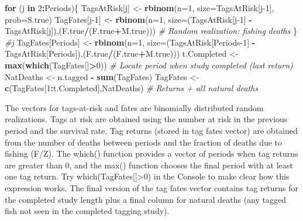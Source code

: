 \documentclass[
]{krantz}
\makeatletter
\newenvironment{Shaded}{\begin{snugshade}}{\end{snugshade}}
\newcommand{\AttributeTok}[1]{\textcolor[rgb]{0.27,0.27,0.27}{#1}}
\newcommand{\CommentTok}[1]{\textcolor[rgb]{0.37,0.37,0.37}{\textit{#1}}}
\newcommand{\ControlFlowTok}[1]{\textcolor[rgb]{0.27,0.27,0.27}{\textbf{#1}}}
\newcommand{\DecValTok}[1]{\textcolor[rgb]{0.06,0.06,0.06}{#1}}
\newcommand{\FunctionTok}[1]{\textcolor[rgb]{0.27,0.27,0.27}{\textbf{#1}}}
\newcommand{\NormalTok}[1]{#1}
\newcommand{\OtherTok}[1]{\textcolor[rgb]{0.37,0.37,0.37}{#1}}
\newcommand{\SpecialCharTok}[1]{\textcolor[rgb]{0.43,0.43,0.43}{\textbf{#1}}}
\newenvironment{kframe}{%
\medskip{}
\setlength{\fboxsep}{.8em}
 \def\at@end@of@kframe{}%
 \ifinner\ifhmode%
  \def\at@end@of@kframe{\end{minipage}}%
  \begin{minipage}{\columnwidth}%
 \fi\fi%
 \def\FrameCommand##1{\hskip\@totalleftmargin \hskip-\fboxsep
 \colorbox{shadecolor}{##1}\hskip-\fboxsep
     \hskip-\linewidth \hskip-\@totalleftmargin \hskip\columnwidth}%
 \MakeFramed {\advance\hsize-\width
   \@totalleftmargin\z@ \linewidth\hsize
   \@setminipage}}%
 {\par\unskip\endMakeFramed%
 \at@end@of@kframe}
\renewenvironment{Shaded}{\begin{kframe}}{\end{kframe}}
\makeatother
\begin{document}
\begin{Shaded}
\begin{Highlighting}[]
\ControlFlowTok{for}\NormalTok{ (j }\ControlFlowTok{in} \DecValTok{2}\SpecialCharTok{:}\NormalTok{Periods)\{}
\NormalTok{  TagsAtRisk[j] }\OtherTok{\textless{}{-}} \FunctionTok{rbinom}\NormalTok{(}\AttributeTok{n=}\DecValTok{1}\NormalTok{, }\AttributeTok{size=}\NormalTok{TagsAtRisk[j}\DecValTok{{-}1}\NormalTok{], }\AttributeTok{prob=}\NormalTok{S.true)}
\NormalTok{  TagFates[j}\DecValTok{{-}1}\NormalTok{] }\OtherTok{\textless{}{-}} \FunctionTok{rbinom}\NormalTok{(}\AttributeTok{n=}\DecValTok{1}\NormalTok{, }\AttributeTok{size=}\NormalTok{(TagsAtRisk[j}\DecValTok{{-}1}\NormalTok{]}
                 \SpecialCharTok{{-}}\NormalTok{TagsAtRisk[j]),(F.true}\SpecialCharTok{/}\NormalTok{(F.true}\SpecialCharTok{+}\NormalTok{M.true))) }
  \CommentTok{\# Random realization: fishing deaths}
\NormalTok{  \} }\CommentTok{\#j}
\NormalTok{TagFates[Periods] }\OtherTok{\textless{}{-}} \FunctionTok{rbinom}\NormalTok{(}\AttributeTok{n=}\DecValTok{1}\NormalTok{, }\AttributeTok{size=}\NormalTok{(TagsAtRisk[Periods}\DecValTok{{-}1}\NormalTok{]}
                    \SpecialCharTok{{-}}\NormalTok{TagsAtRisk[Periods]),(F.true}\SpecialCharTok{/}\NormalTok{(F.true}\SpecialCharTok{+}\NormalTok{M.true)))}
\NormalTok{t.Completed }\OtherTok{\textless{}{-}} \FunctionTok{max}\NormalTok{(}\FunctionTok{which}\NormalTok{(TagFates[]}\SpecialCharTok{\textgreater{}}\DecValTok{0}\NormalTok{))}
\CommentTok{\# Locate period when study completed (last return)}
\NormalTok{NatDeaths }\OtherTok{\textless{}{-}}\NormalTok{ n.tagged }\SpecialCharTok{{-}} \FunctionTok{sum}\NormalTok{(TagFates)}
\NormalTok{TagFates }\OtherTok{\textless{}{-}} \FunctionTok{c}\NormalTok{(TagFates[}\DecValTok{1}\SpecialCharTok{:}\NormalTok{t.Completed],NatDeaths) }
\CommentTok{\# Returns + all natural deaths}
\end{Highlighting}
\end{Shaded}

The vectors for tags-at-risk and fates are binomially distributed random realizations. Tags at risk are obtained using the number at risk in the previous period and the survival rate. Tag returns (stored in tag fates vector) are obtained from the number of deaths between periods and the fraction of deaths due to fishing (F/Z). The which() function provides a vector of periods when tag returns are greater than 0, and the max() function chooses the final period with at least one tag return. Try which(TagFates{[}{]}\textgreater0) in the Console to make clear how this expression works. The final version of the tag fates vector contains tag returns for the completed study length plus a final column for natural deaths (any tagged fish not seen in the completed tagging study).
\end{document}
